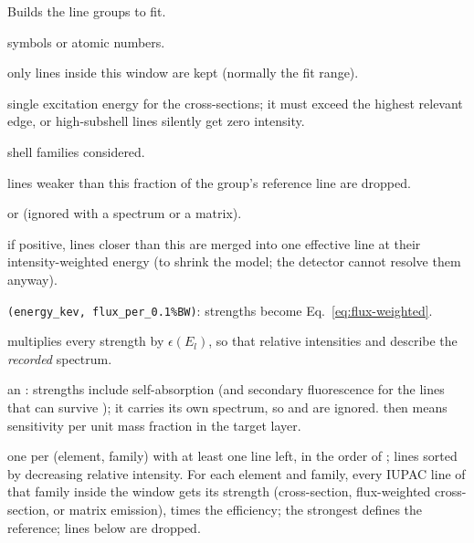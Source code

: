 Builds the line groups to fit.
\begin{args}
\item[elements] symbols or atomic numbers.
\item[emin\_ev, emax\_ev] only lines inside this window are kept (normally the fit range).
\item[e0\_eff\_kev] single excitation energy for the cross-sections; it must exceed the
  highest relevant edge, or high-subshell lines silently get zero intensity.
\item[families] shell families considered.
\item[min\_rel] lines weaker than this fraction of the group's reference line are dropped.
\item[weighting]  or  (ignored with a spectrum or a matrix).
\item[merge\_within\_ev] if positive, lines closer than this are merged into one effective
  line at their intensity-weighted energy (to shrink the model; the detector cannot resolve
  them anyway).
\item[incident\_spectrum] \texttt{(energy\_kev, flux\_per\_0.1\%BW)}: strengths become
  Eq.~\eqref{eq:flux-weighted}.
\item[detector] multiplies every strength by $\epsilon(E_l)$, so that relative intensities
  and  describe the \emph{recorded} spectrum.
\item[matrix] an : strengths include self-absorption (and
  secondary fluorescence for the lines that can survive ); it carries its own
  spectrum, so  and  are ignored. 
  then means sensitivity per unit mass fraction in the target layer.
\end{args}
 one  per (element, family) with at least one line left, in the
order of ; lines sorted by decreasing relative intensity.
 For each element and family, every IUPAC line of that family inside the window
gets its strength (cross-section, flux-weighted cross-section, or matrix emission), times
the efficiency; the strongest defines the reference; lines below  are dropped.

